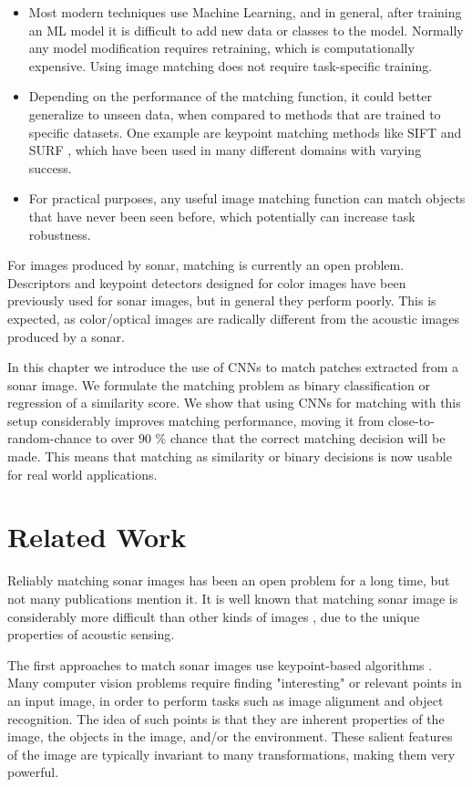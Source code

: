 \begin{itemize}
	\item Most modern techniques use Machine Learning, and in general, after training an ML model it is difficult to add new data or classes to the model. Normally any model modification requires retraining, which is computationally expensive. Using image matching does not require task-specific training.
	\item Depending on the performance of the matching function, it could better generalize to unseen data, when compared to methods that are trained to specific datasets. One example are keypoint matching methods like SIFT \cite[-3em]{lowe2004distinctive} and SURF \cite[1em]{bay2006surf}, which have been used in many different domains with varying success.
	\item For practical purposes, any useful image matching function can match objects that have never been seen before, which potentially can increase task robustness.
\end{itemize}

For images produced by sonar, matching is currently an open problem. Descriptors and keypoint detectors designed for color images have been previously used for sonar images, but in general they perform poorly. This is expected, as color/optical images are radically different from the acoustic images produced by a sonar.

In this chapter we introduce the use of CNNs to match patches extracted from a sonar image. We formulate the matching problem as binary classification or regression of a similarity score. We show that using CNNs for matching with this setup considerably improves matching performance, moving it from close-to-random-chance to over $90$ \% chance that the correct matching decision will be made. This means that matching as similarity or binary decisions is now usable for real world applications.

\section{Related Work}

Reliably matching sonar images has been an open problem for a long time, but not many publications mention it. It is well known that matching sonar image is considerably more difficult than other kinds of images \cite{negahdaripour2011dynamic}, due to the unique properties of acoustic sensing.

The first approaches to match sonar images use keypoint-based algorithms \cite[1em]{szeliski2010computer}. Many computer vision problems require finding "interesting" or relevant points in an input image, in order to perform tasks such as image alignment and object recognition. The idea of such points is that they are inherent properties of the image, the objects in the image, and/or the environment. These salient features of the image are typically invariant to many transformations, making them very powerful. 

